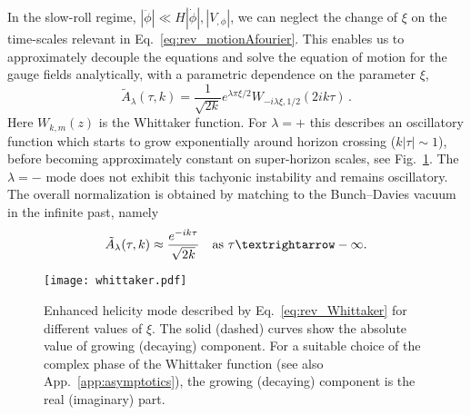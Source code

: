 In the slow-roll regime, $|\ddot \phi| \ll H |\dot \phi|, | V_{,\phi}|$, we can neglect the change of $\xi$ on the time-scales relevant in Eq.~\eqref{eq:rev_motionAfourier}. This enables us to approximately decouple the equations and solve the equation of motion for the gauge fields analytically, with a parametric dependence on the parameter $\xi$,
\begin{equation}
 \tilde A_\lambda(\tau,k) = \frac{1}{\sqrt{2k}} e^{\lambda \pi \xi/2} W_{- i \lambda \xi, 1/2}(2 i k \tau) \,.
 \label{eq:rev_Whittaker}
\end{equation}
Here $W_{k,m}(z)$ is the Whittaker function. For $\lambda = +$ this describes an oscillatory function which starts to grow exponentially around horizon crossing ($k |\tau| \sim 1$), before becoming approximately constant on super-horizon scales, see Fig.~\ref{fig:Whittakerabelian}. The $\lambda = -$ mode does not exhibit this tachyonic instability and remains oscillatory.
The overall normalization is obtained by matching to the Bunch--Davies vacuum in the infinite past, namely 
\begin{equation}
\tilde{A}_{\lambda}(\tau,k)\approx\frac{e^{-ik\tau}}{\sqrt{2k}}\quad\textrm{as }\tau\textrightarrow-\infty.\label{eq:BDvac}
\end{equation}

\begin{figure}
 \center
 \texttt{[image: whittaker.pdf]}
 \caption{Enhanced helicity mode described by Eq.~\eqref{eq:rev_Whittaker} for different values of $\xi$. The solid (dashed) curves show the absolute value of growing (decaying) component. For a suitable choice of the complex phase of the Whittaker function (see also App.~\ref{app:asymptotics}), the growing (decaying) component is the real (imaginary) part.}
 \label{fig:Whittakerabelian}
\end{figure}


